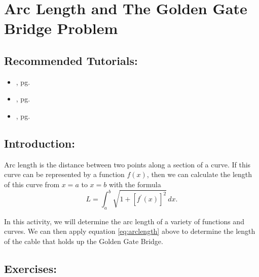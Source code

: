 \section{Arc Length and The Golden Gate Bridge Problem}
\label{sec:golden_gate_bridge_problem}	

\subsection*{Recommended Tutorials:}
\begin{itemize}[noitemsep]
    \item {}, pg. \pageref{chp:plotting_functions}
    \item {}, pg. \pageref{chp:equation_solvers}
	\item {}, pg. \pageref{chp:definite_and_indefinite_Integrals}
\end{itemize}

\subsection*{Introduction:}
Arc length is the distance between two points along a section of a curve. If this curve can be represented by a function $f(x)$, then we can calculate the length of this curve from $x=a$ to $x=b$ with the formula
\begin{equation}
    \label{eq:arclength}
    L = \displaystyle\int_{a}^b \sqrt{1 + [f^{\prime}(x)]^2}\, dx.
\end{equation}

In this activity, we will determine the arc length of a variety of functions and curves. We can then apply equation \eqref{eq:arclength} above to determine the length of the cable that holds up the Golden Gate Bridge.


\subsection*{Exercises:}


